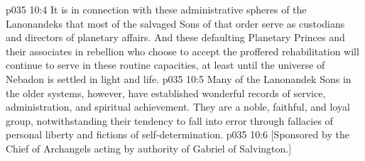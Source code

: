 \vs p035 10:4 \pc It is in connection with these administrative spheres of the Lanonandeks that most of the salvaged Sons of that order serve as custodians and directors of planetary affairs. And these defaulting Planetary Princes and their associates in rebellion who choose to accept the proffered rehabilitation will continue to serve in these routine capacities, at least until the universe of Nebadon is settled in light and life.
\vs p035 10:5 \pc Many of the Lanonandek Sons in the older systems, however, have established wonderful records of service, administration, and spiritual achievement. They are a noble, faithful, and loyal group, notwithstanding their tendency to fall into error through fallacies of personal liberty and fictions of self\hyp{}determination.
\vsetoff
\vs p035 10:6 [Sponsored by the Chief of Archangels acting by authority of Gabriel of Salvington.]
\quizlink
